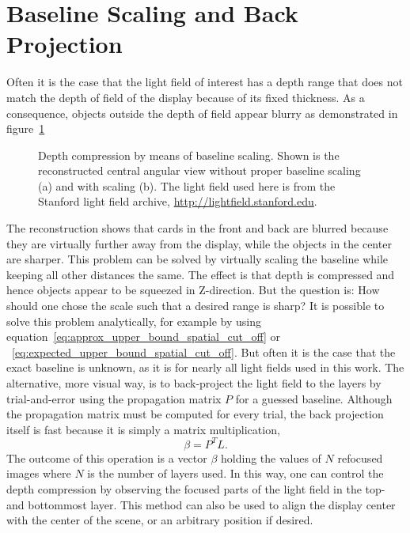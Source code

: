 \section{Baseline Scaling and Back Projection}
\label{sec:baseline_scaling}

Often it is the case that the light field of interest has a depth range that does not match the depth of field of the display because of its fixed thickness.
As a consequence, objects outside the depth of field appear blurry as demonstrated in figure~\ref{fig:reconstruction_baseline_unscaled}
\begin{figure}[tb]
	\begin{subfigure}{0.5\textwidth}
		\centering
		
		\caption{}
		\label{fig:reconstruction_baseline_unscaled}
	\end{subfigure}%
	\begin{subfigure}{0.5\textwidth}
		\centering
		
		\caption{}
		\label{fig:reconstruction_baseline_scaled_shifted}
	\end{subfigure}
	\caption[Baseline scaling]
			{Depth compression by means of baseline scaling.
			 Shown is the reconstructed central angular view without proper baseline scaling (a) and with scaling (b).
			 The light field used here is from the Stanford light field archive, \mbox{\url{http://lightfield.stanford.edu}}.}
	\label{fig:baseline_scaling}
\end{figure}
The reconstruction shows that cards in the front and back are blurred because they are virtually further away from the display, while the objects in the center are sharper.
This problem can be solved by virtually scaling the baseline while keeping all other distances the same.
The effect is that depth is compressed and hence objects appear to be squeezed in Z-direction.
But the question is: How should one chose the scale such that a desired range is sharp?
It is possible to solve this problem analytically, for example by using equation~\ref{eq:approx_upper_bound_spatial_cut_off} or ~\ref{eq:expected_upper_bound_spatial_cut_off}.
But often it is the case that the exact baseline is unknown, as it is for nearly all light fields used in this work.
The alternative, more visual way, is to back-project the light field to the layers by trial-and-error using the propagation matrix $P$ for a guessed baseline.
Although the propagation matrix must be computed for every trial, the back projection itself is fast because it is simply a matrix multiplication, 
\begin{equation*}\label{eq:back_projection}
	\beta = P^T L.
\end{equation*}
The outcome of this operation is a vector $\beta$ holding the values of $N$ refocused images where $N$ is the number of layers used.
In this way, one can control the depth compression by observing the focused parts of the light field in the top- and bottommost layer.
This method can also be used to align the display center with the center of the scene, or an arbitrary position if desired.

